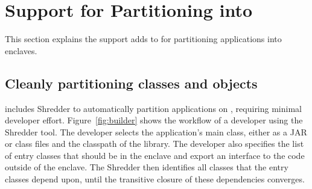 \section{\java{} Support for Partitioning into \sgx{}}
\label{sec:concept}

This section explains the support \sysname{} adds to \java{}
for partitioning applications into \sgx{} enclaves.

\subsection{Cleanly partitioning classes and objects}
\label{sec:concept:partition}


\sysname{} includes Shredder to automatically partition \java{} applications on \sgx{},
requiring  minimal developer effort.
Figure~\ref{fig:builder} shows the workflow of a developer using the \sysname{} Shredder tool.
The developer selects the application's main class, either as a JAR or class files
and the classpath of the library.
The developer also specifies the list of
entry classes that should be in the enclave and export an interface to the code 
outside of the enclave.
The Shredder then
identifies all classes that the entry classes depend upon,
until the transitive closure of these dependencies converges.

